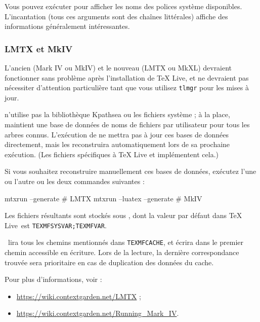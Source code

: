\documentclass[german, english, french, 12pt]{article}
\renewcommand{\TL}{\TeX{} Live\xspace}%
\begin{document}
Vous pouvez exécuter  pour afficher les noms des polices système
disponibles. L'incantation  (tous ces
arguments sont des chaînes littérales) affiche des informations généralement
intéressantes.

\subsubsection{\protect\ConTeXt{} LMTX et MkIV}
\label{sec:context} %
\label{sec:context-mkiv}

L'ancien \ConTeXt{} (Mark IV ou MkIV) et le nouveau \ConTeXt{} (LMTX ou MkXL)
devraient fonctionner sans problème après l'installation de \TL{}, et ne
devraient pas nécessiter d'attention particulière tant que vous utilisez
\verb+tlmgr+ pour les mises à jour.

\ConTeXt{} n'utilise pas la bibliothèque Kpathsea ou les fichiers système
 ; à la place, \ConTeXt{} maintient une base de données de noms de
fichiers par utilisateur pour tous les arbres connus. L'exécution de
 ne mettra pas à jour ces bases de données directement, mais
\ConTeXt{} les reconstruira automatiquement lors de sa prochaine exécution. (Les
fichiers spécifiques à \TL{}  et 
implémentent cela.)

Si vous souhaitez reconstruire manuellement ces bases de données, exécutez l'une
ou l'autre ou les deux commandes suivantes :
\begin{sverbatim}
mtxrun --generate          # LMTX
mtxrun --luatex --generate # MkIV
\end{sverbatim}
Les fichiers résultants sont stockés sous , dont la valeur par
défaut dans \TL\ est \verb+TEXMFSYSVAR;TEXMFVAR+.

\ConTeXt\ lira tous les chemins mentionnés dans \verb+TEXMFCACHE+, et écrira
dans le premier chemin accessible en écriture. Lors de la lecture, la dernière
correspondance trouvée sera prioritaire en cas de duplication des données du
cache.

Pour plus d'informations, voir :
\begin{itemize}
\item \url{https://wiki.contextgarden.net/LMTX} ;
\item \url{https://wiki.contextgarden.net/Running_Mark_IV}.
\end{itemize}
\end{document}
